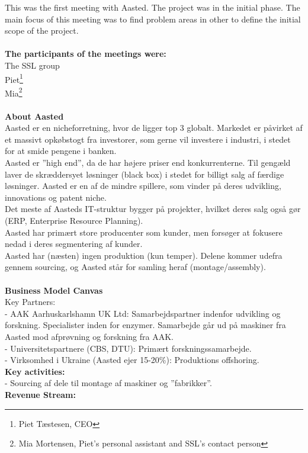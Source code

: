 This was the first meeting with Aasted. The project was in the initial phase. The main focus of this meeting was to find problem areas in other to define the initial scope of the project.\\\\ 
\textbf{The participants of the meetings were:}\\
The SSL group\\
Piet\footnote{Piet Tæstesen, CEO}\\
Mia\footnote{Mia Mortensen, Piet's personal assistant and SSL's contact person}\\\\
\textbf{About Aasted}\\
Aasted er en nicheforretning, hvor de ligger top 3 globalt. Markedet er påvirket af et massivt opkøbstogt fra investorer, som gerne vil investere i industri, i stedet for at smide pengene i banken.\\
Aasted er ”high end”, da de har højere priser end konkurrenterne. Til gengæld laver de skræddersyet løsninger (black box) i stedet for billigt salg af færdige løsninger. Aasted er en af de mindre spillere, som vinder på deres udvikling, innovations og patent niche.\\
Det meste af Aasteds IT-struktur bygger på projekter, hvilket deres salg også gør (ERP, Enterprise Resource Planning).\\
Aasted har primært store producenter som kunder, men forsøger at fokusere nedad i deres segmentering af kunder.\\
Aasted har (næsten) ingen produktion (kun temper). Delene kommer udefra gennem sourcing, og Aasted står for samling heraf (montage/assembly).\\\\
\textbf{Business Model Canvas}\\
Key Partners:\\
- AAK Aarhuskarlshamn UK Ltd: Samarbejdspartner indenfor udvikling og forskning. Specialister inden for enzymer. Samarbejde går ud på maskiner fra Aasted mod afprøvning og forskning fra AAK.\\
- Universitetspartnere (CBS, DTU): Primært forskningssamarbejde.\\
- Virksomhed i Ukraine (Aasted ejer 15-20\%): Produktions offshoring.\\
\textbf{Key activities:}\\
- Sourcing af dele til montage af maskiner og ”fabrikker”.\\
\textbf{Revenue Stream:}\\
